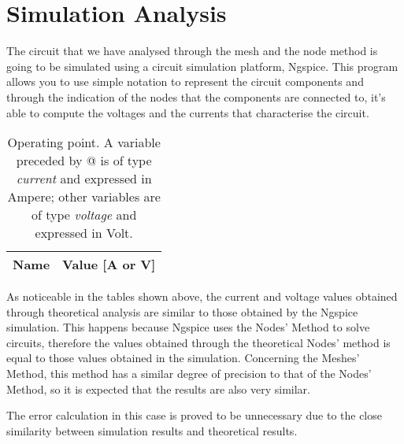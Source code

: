 \section{Simulation Analysis}
\label{sec:simulation}

The circuit that we have analysed through the mesh and the node method is going to be simulated using a circuit simulation platform, Ngspice. This program allows you to use simple notation to represent the circuit components and through the indication of the nodes that the components are connected to, it's able to compute the voltages and the currents that characterise the circuit.

\begin{table}[h]
  \centering
  \begin{tabular}{|l|r|}
    \hline    
    {\bf Name} & {\bf Value [A or V]} \\ \hline
    
  \end{tabular}
  \caption{Operating point. A variable preceded by @ is of type {\em current}
    and expressed in Ampere; other variables are of type {\it voltage} and expressed in
    Volt.}
  \label{tab:op}
\end{table}


As noticeable in the tables shown above, the current and voltage values obtained through theoretical analysis are similar to those obtained by the Ngspice simulation. This happens because Ngspice uses the Nodes' Method to solve circuits, therefore the values obtained through the theoretical Nodes' method is equal to those values obtained in the simulation. Concerning the Meshes' Method, this method has a similar degree of precision to that of the Nodes' Method, so it is expected that the results are also very similar.

The error calculation in this case is proved to be unnecessary due to the close similarity between simulation results and theoretical results.
